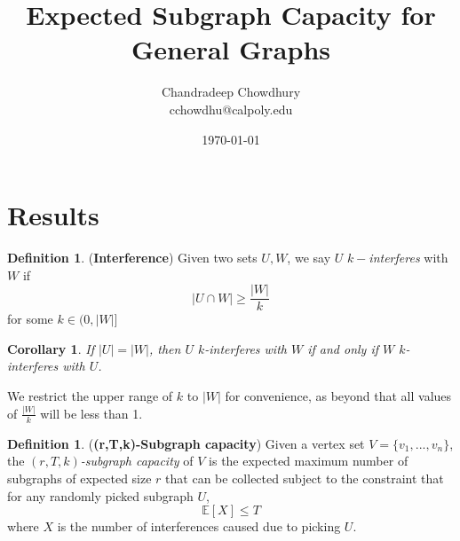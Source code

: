 \documentclass[10pt]{extarticle}
\title{\textbf{Expected Subgraph Capacity for General Graphs}}
\author{Chandradeep Chowdhury \\ cchowdhu@calpoly.edu}
\date{\today}
\newcommand{\E}{\mathbb{E}}
\newtheorem{corollary}[theorem]{Corollary}
\theoremstyle{definition}
\newtheorem{definition}[theorem]{Definition}
\begin{document}

\section{Results}

\begin{definition}
    (\textbf{Interference}) Given two sets $U, W$, we say $U$ $k-$\textit{interferes} with $W$ if 
    \begin{equation}
        |U \cap W| \ge  \frac{|W|}{k}
    \end{equation}
    for some $k \in (0,|W|]$
\end{definition}

\begin{corollary}
    If $|U| = |W|$, then $U$ $k$-interferes with $W$ if and only if $W$ $k$-interferes with $U$.
\end{corollary}

We restrict the upper range of $k$ to $|W|$ for convenience, as beyond that all values of $\frac{|W|}{k}$ will be less than 1.

\begin{definition} (\textbf{(r,T,k)-Subgraph capacity}) Given a vertex set $V = \{v_1,...,v_n\}$, the \textit{$(r,T,k)$-subgraph capacity} of $V$ is the expected maximum number of subgraphs of expected size $r$ that can be collected subject to the constraint that for any randomly picked subgraph $U$, 
\begin{equation}
    \E[X] \le T
\end{equation}
where $X$ is the number of interferences caused due to picking $U$. 
\end{definition}
\end{document}
